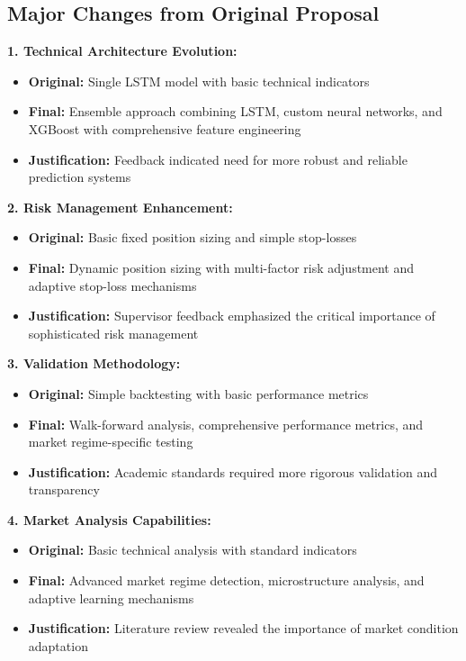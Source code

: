 \documentclass[conference]{IEEEtran}
\begin{document}
\subsection*{Major Changes from Original Proposal}

\textbf{1. Technical Architecture Evolution:}
\begin{itemize}
    \item \textbf{Original:} Single LSTM model with basic technical indicators
    \item \textbf{Final:} Ensemble approach combining LSTM, custom neural networks, and XGBoost with comprehensive feature engineering
    \item \textbf{Justification:} Feedback indicated need for more robust and reliable prediction systems
\end{itemize}

\textbf{2. Risk Management Enhancement:}
\begin{itemize}
    \item \textbf{Original:} Basic fixed position sizing and simple stop-losses
    \item \textbf{Final:} Dynamic position sizing with multi-factor risk adjustment and adaptive stop-loss mechanisms
    \item \textbf{Justification:} Supervisor feedback emphasized the critical importance of sophisticated risk management
\end{itemize}

\textbf{3. Validation Methodology:}
\begin{itemize}
    \item \textbf{Original:} Simple backtesting with basic performance metrics
    \item \textbf{Final:} Walk-forward analysis, comprehensive performance metrics, and market regime-specific testing
    \item \textbf{Justification:} Academic standards required more rigorous validation and transparency
\end{itemize}

\textbf{4. Market Analysis Capabilities:}
\begin{itemize}
    \item \textbf{Original:} Basic technical analysis with standard indicators
    \item \textbf{Final:} Advanced market regime detection, microstructure analysis, and adaptive learning mechanisms
    \item \textbf{Justification:} Literature review revealed the importance of market condition adaptation
\end{itemize}
\end{document}
